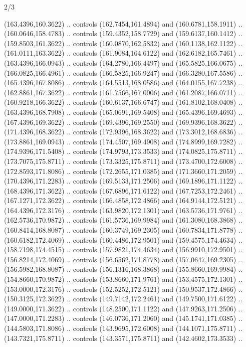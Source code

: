 \begin{flagdescription}{2/3}
\begin{scope}[shift={(0.5\flaglength,0.5)},scale=\flagwidth/320]
\begin{scope}[y=0.8pt, x=0.8pt, yscale=-1,shift={(-300,-200)}]
{\begin{scope}[line width=0.0011\flagwidth]
  (163.4396,160.3622) .. controls (162.7454,161.4894) and (160.6781,158.1911) ..
  (160.0646,158.4783) .. controls (159.4352,158.7729) and (159.6137,160.1412) ..
  (159.8503,161.3622) .. controls (160.0870,162.5832) and (160.1138,162.1122) ..
  (161.0111,163.3622) .. controls (161.9084,164.6122) and (162.6182,165.7461) ..
  (163.4396,166.0943) .. controls (164.2780,166.4497) and (165.5825,166.0675) ..
  (166.0825,166.4961) .. controls (166.5825,166.9247) and (166.3280,167.5586) ..
  (165.4396,167.8086) .. controls (164.5513,168.0586) and (164.0155,167.7238) ..
  (162.8861,167.3622) .. controls (161.7566,167.0006) and (161.2087,166.0711) ..
  (160.9218,166.3622) .. controls (160.6137,166.6747) and (161.8102,168.0408) ..
  (163.4396,168.7908) .. controls (165.0691,169.5408) and (165.4396,169.4693) ..
  (167.4396,169.3622) .. controls (169.4396,169.2550) and (169.9396,168.3622) ..
  (171.4396,168.3622) .. controls (172.9396,168.3622) and (173.3012,168.6836) ..
  (173.8861,169.0943) .. controls (174.4507,169.4908) and (174.8999,169.7282) ..
  (174.9396,171.5408) .. controls (174.9793,173.3533) and (174.0825,175.8711) ..
  (173.7075,175.8711) .. controls (173.3325,175.8711) and (173.4700,172.6008) ..
  (172.8593,171.8086) .. controls (172.2655,171.0385) and (171.3660,171.2059) ..
  (170.4396,171.2283) .. controls (169.5133,171.2506) and (169.1896,171.1122) ..
  (168.4396,171.3622) .. controls (167.6896,171.6122) and (167.7253,172.2461) ..
  (167.1271,172.3622) .. controls (166.4858,172.4866) and (164.9144,172.5121) ..
  (164.4396,172.3176) .. controls (163.9820,172.1301) and (163.5736,171.9761) ..
  (162.5736,170.9872) .. controls (161.5736,169.9984) and (161.3080,168.3868) ..
  (160.8414,168.8087) .. controls (160.3749,169.2305) and (160.7834,171.8778) ..
  (160.6182,172.4069) .. controls (160.4486,172.9501) and (159.4575,174.4634) ..
  (158.7198,174.4515) .. controls (157.9821,174.4634) and (156.9910,172.9501) ..
  (156.8214,172.4069) .. controls (156.6562,171.8778) and (157.0647,169.2305) ..
  (156.5982,168.8087) .. controls (156.1316,168.3868) and (155.8660,169.9984) ..
  (154.8660,170.9872) .. controls (153.8660,171.9761) and (153.4575,172.1301) ..
  (153.0000,172.3176) .. controls (152.5252,172.5121) and (150.9537,172.4866) ..
  (150.3125,172.3622) .. controls (149.7142,172.2461) and (149.7500,171.6122) ..
  (149.0000,171.3622) .. controls (148.2500,171.1122) and (147.9263,171.2506) ..
  (147.0000,171.2283) .. controls (146.0736,171.2060) and (145.1741,171.0385) ..
  (144.5803,171.8086) .. controls (143.9695,172.6008) and (144.1071,175.8711) ..
  (143.7321,175.8711) .. controls (143.3571,175.8711) and (142.4602,173.3533) ..

\end{scope}}
\end{scope}
\end{scope}
\end{flagdescription}
